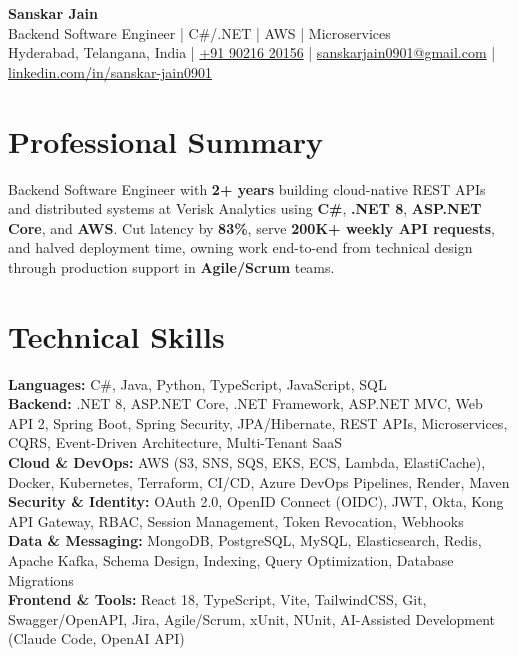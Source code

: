 \documentclass[a4paper,10pt]{article}
\begin{document}
\begin{center}
    {\LARGE \textbf{Sanskar Jain}} \\
    \vspace{1pt}
    Backend Software Engineer \;|\; C\#/.NET \;|\; AWS \;|\; Microservices \\
    Hyderabad, Telangana, India \;|\;
    \href{tel:+919021620156}{+91 90216 20156} \;|\;
    \href{mailto:sanskarjain0901@gmail.com}{sanskarjain0901@gmail.com} \;|\;
    \href{https://www.linkedin.com/in/sanskar-jain0901/}{linkedin.com/in/sanskar-jain0901}
\end{center}

\vspace{2pt}

\section*{Professional Summary}
Backend Software Engineer with \textbf{2+ years} building cloud-native REST APIs and distributed systems at Verisk Analytics using \textbf{C\#}, \textbf{.NET 8}, \textbf{ASP.NET Core}, and \textbf{AWS}.
Cut latency by \textbf{83\%}, serve \textbf{200K+ weekly API requests}, and halved deployment time, owning work end-to-end from technical design through production support in \textbf{Agile/Scrum} teams.

\section*{Technical Skills}
\begin{sloppypar}
\noindent
\textbf{Languages:} C\#, Java, Python, TypeScript, JavaScript, SQL \\
\textbf{Backend:} .NET 8, ASP.NET Core, .NET Framework, ASP.NET MVC, Web API 2, Spring Boot, Spring Security, JPA/Hibernate, REST APIs, Microservices, CQRS, Event-Driven Architecture, Multi-Tenant SaaS \\
\textbf{Cloud \& DevOps:} AWS (S3, SNS, SQS, EKS, ECS, Lambda, ElastiCache), Docker, Kubernetes, Terraform, CI/CD, Azure DevOps Pipelines, Render, Maven \\
\textbf{Security \& Identity:} OAuth 2.0, OpenID Connect (OIDC), JWT, Okta, Kong API Gateway, RBAC, Session Management, Token Revocation, Webhooks \\
\textbf{Data \& Messaging:} MongoDB, PostgreSQL, MySQL, Elasticsearch, Redis, Apache Kafka, Schema Design, Indexing, Query Optimization, Database Migrations \\
\textbf{Frontend \& Tools:} React 18, TypeScript, Vite, TailwindCSS, Git, Swagger/OpenAPI, Jira, Agile/Scrum, xUnit, NUnit, AI-Assisted Development (Claude Code, OpenAI API)
\end{sloppypar}
\end{document}

